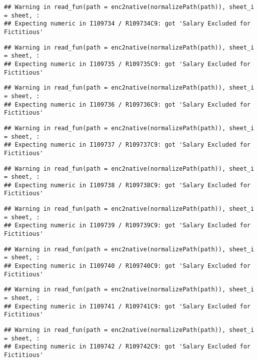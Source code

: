 \documentclass[
]{article}
\begin{document}
\begin{verbatim}
## Warning in read_fun(path = enc2native(normalizePath(path)), sheet_i = sheet, :
## Expecting numeric in I109734 / R109734C9: got 'Salary Excluded for Fictitious'
\end{verbatim}

\begin{verbatim}
## Warning in read_fun(path = enc2native(normalizePath(path)), sheet_i = sheet, :
## Expecting numeric in I109735 / R109735C9: got 'Salary Excluded for Fictitious'
\end{verbatim}

\begin{verbatim}
## Warning in read_fun(path = enc2native(normalizePath(path)), sheet_i = sheet, :
## Expecting numeric in I109736 / R109736C9: got 'Salary Excluded for Fictitious'
\end{verbatim}

\begin{verbatim}
## Warning in read_fun(path = enc2native(normalizePath(path)), sheet_i = sheet, :
## Expecting numeric in I109737 / R109737C9: got 'Salary Excluded for Fictitious'
\end{verbatim}

\begin{verbatim}
## Warning in read_fun(path = enc2native(normalizePath(path)), sheet_i = sheet, :
## Expecting numeric in I109738 / R109738C9: got 'Salary Excluded for Fictitious'
\end{verbatim}

\begin{verbatim}
## Warning in read_fun(path = enc2native(normalizePath(path)), sheet_i = sheet, :
## Expecting numeric in I109739 / R109739C9: got 'Salary Excluded for Fictitious'
\end{verbatim}

\begin{verbatim}
## Warning in read_fun(path = enc2native(normalizePath(path)), sheet_i = sheet, :
## Expecting numeric in I109740 / R109740C9: got 'Salary Excluded for Fictitious'
\end{verbatim}

\begin{verbatim}
## Warning in read_fun(path = enc2native(normalizePath(path)), sheet_i = sheet, :
## Expecting numeric in I109741 / R109741C9: got 'Salary Excluded for Fictitious'
\end{verbatim}

\begin{verbatim}
## Warning in read_fun(path = enc2native(normalizePath(path)), sheet_i = sheet, :
## Expecting numeric in I109742 / R109742C9: got 'Salary Excluded for Fictitious'
\end{verbatim}
\end{document}
